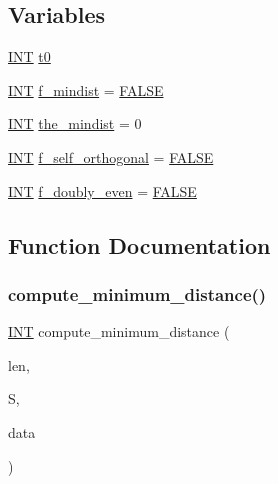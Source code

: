 \subsection*{Variables}
\begin{DoxyCompactItemize}
\item 
\mbox{\hyperlink{galois_8h_a09fddde158a3a20bd2dcadb609de11dc}{I\+NT}} \mbox{\hyperlink{subspace__orbits__main_8_c_a4268f4fe222ffb119218a0199f5e1904}{t0}}
\item 
\mbox{\hyperlink{galois_8h_a09fddde158a3a20bd2dcadb609de11dc}{I\+NT}} \mbox{\hyperlink{subspace__orbits__main_8_c_ac060fcc9b6537aa4d448e179db5b865d}{f\+\_\+mindist}} = \mbox{\hyperlink{nauty_8h_aa93f0eb578d23995850d61f7d61c55c1}{F\+A\+L\+SE}}
\item 
\mbox{\hyperlink{galois_8h_a09fddde158a3a20bd2dcadb609de11dc}{I\+NT}} \mbox{\hyperlink{subspace__orbits__main_8_c_a24faf0bb98712f3e254328f8727ec1ca}{the\+\_\+mindist}} = 0
\item 
\mbox{\hyperlink{galois_8h_a09fddde158a3a20bd2dcadb609de11dc}{I\+NT}} \mbox{\hyperlink{subspace__orbits__main_8_c_af989ab75217f623c729e478c457fc5e0}{f\+\_\+self\+\_\+orthogonal}} = \mbox{\hyperlink{nauty_8h_aa93f0eb578d23995850d61f7d61c55c1}{F\+A\+L\+SE}}
\item 
\mbox{\hyperlink{galois_8h_a09fddde158a3a20bd2dcadb609de11dc}{I\+NT}} \mbox{\hyperlink{subspace__orbits__main_8_c_a05f384e95d541f5e5dc58d360739ba99}{f\+\_\+doubly\+\_\+even}} = \mbox{\hyperlink{nauty_8h_aa93f0eb578d23995850d61f7d61c55c1}{F\+A\+L\+SE}}
\end{DoxyCompactItemize}


\subsection{Function Documentation}
\mbox{\label{subspace__orbits__main_8_c_a4df477fbec3d64334f000e211f31ff6b}} 
\subsubsection{\texorpdfstring{compute\+\_\+minimum\+\_\+distance()}{compute\_minimum\_distance()}}
{\footnotesize\ttfamily \mbox{\hyperlink{galois_8h_a09fddde158a3a20bd2dcadb609de11dc}{I\+NT}} compute\+\_\+minimum\+\_\+distance (\begin{DoxyParamCaption}\item[{\mbox{\hyperlink{galois_8h_a09fddde158a3a20bd2dcadb609de11dc}{I\+NT}}}]{len,  }\item[{\mbox{\hyperlink{galois_8h_a09fddde158a3a20bd2dcadb609de11dc}{I\+NT}} $\ast$}]{S,  }\item[{void $\ast$}]{data }\end{DoxyParamCaption})}

